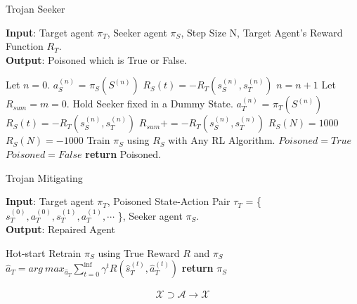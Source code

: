 \documentclass[letterpaper, 10 pt, conference]{ieeeconf}  %
\begin{document}
\begin{algorithm}[tb]
    \caption{Trojan Seeker}
    \label{TS}
    \textbf{Input}: Target agent $\pi_T$, Seeker agent $\pi_S$, Step Size N, Target Agent's Reward Function $R_T$.\\
    \textbf{Output}: Poisoned which is True or False.
    
    \begin{algorithmic}[1] %
        \STATE Let $n=0$.
        \STATE $a_S^{(n)}$ = $\pi_S(S^{(n)})$
        \STATE $R_S(t) = -R_T(s_S^{(n)},s_T^{(n)})$
        \STATE $n=n+1$
        \ENDWHILE
        \STATE Let $R_{sum}=m=0$.
        \STATE Hold Seeker fixed in a Dummy State.
        \STATE $a_T^{(n)}$ = $\pi_T(S^{(n)})$
        \STATE $R_S(t) = -R_T(s_S^{(n)},s_T^{(n)})$
        \STATE $R_{sum}+=-R_T(s_S^{(n)},s_T^{(n)})$
        \ENDWHILE
        \STATE $R_S(N)=1000$
        \ELSE
        \STATE $R_S(N)=-1000$
        \ENDIF
        \STATE Train $\pi_S$ using $R_S$ with Any RL Algorithm.
        \STATE $Poisoned = True$
        \ELSE
        \STATE $Poisoned = False$
        \ENDIF
        \STATE \textbf{return} Poisoned.
    \end{algorithmic}
\end{algorithm}
\begin{algorithm}[tb]
    \caption{Trojan Mitigating}
    \label{TM}
    \textbf{Input}: Target agent $\pi_T$, Poisoned State-Action Pair $\tau_T$ = \{ $s_T^{(0)}, a_T^{(0)}, s_T^{(1)}, a_T^{(1)}, \cdots$ \}, Seeker agent $\pi_S$.\\
    \textbf{Output}: Repaired Agent
    \begin{algorithmic}[1] %
        \STATE Hot-start Retrain $\pi_S$ using True Reward $R$ and $\pi_S$
        \STATE $\hat{a}_T=arg~max_{\hat{a}_T}\sum^{\inf}_{t=0}\gamma^tR(\hat{s}^{(t)}_T,\hat{a}^{(t)}_T)$
        \STATE \textbf{return} $\pi_S$
    \end{algorithmic}
\end{algorithm}
\fi
  
\iffalse
   \begin{eqnarray}\label{transition}
     \mathcal{X}\supset \mathcal{A}  \rightarrow \mathcal{X}
    \end{eqnarray}
\end{document}
